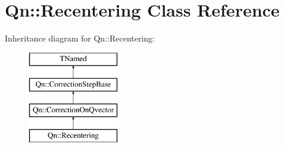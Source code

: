 \hypertarget{classQn_1_1Recentering}{}\section{Qn\+:\+:Recentering Class Reference}
\label{classQn_1_1Recentering}
Inheritance diagram for Qn\+:\+:Recentering\+:\begin{figure}[H]
\begin{center}
\leavevmode
\includegraphics[height=4.000000cm]{classQn_1_1Recentering}
\end{center}
\end{figure}
